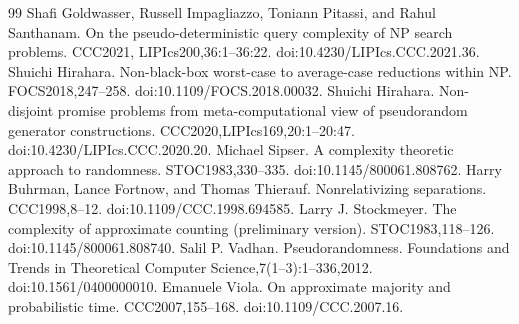 \documentclass[10pt,a4paper]{article}
\begin{document}
\begin{thebibliography}{99}
 Shafi Goldwasser, Russell Impagliazzo, Toniann Pitassi, and Rahul Santhanam. On the pseudo-deterministic query complexity of NP search problems. CCC2021, LIPIcs200,36:1--36:22. doi:10.4230/LIPIcs.CCC.2021.36.
 Shuichi Hirahara. Non-black-box worst-case to average-case reductions within NP. FOCS2018,247--258. doi:10.1109/FOCS.2018.00032.
 Shuichi Hirahara. Non-disjoint promise problems from meta-computational view of pseudorandom generator constructions. CCC2020,LIPIcs169,20:1--20:47. doi:10.4230/LIPIcs.CCC.2020.20.
 Michael Sipser. A complexity theoretic approach to randomness. STOC1983,330--335. doi:10.1145/800061.808762.
 Harry Buhrman, Lance Fortnow, and Thomas Thierauf. Nonrelativizing separations. CCC1998,8--12. doi:10.1109/CCC.1998.694585.
 Larry J. Stockmeyer. The complexity of approximate counting (preliminary version). STOC1983,118--126. doi:10.1145/800061.808740.
 Salil P. Vadhan. Pseudorandomness. Foundations and Trends in Theoretical Computer Science,7(1--3):1--336,2012. doi:10.1561/0400000010.
 Emanuele Viola. On approximate majority and probabilistic time. CCC2007,155--168. doi:10.1109/CCC.2007.16.
\end{thebibliography}
\end{document}
